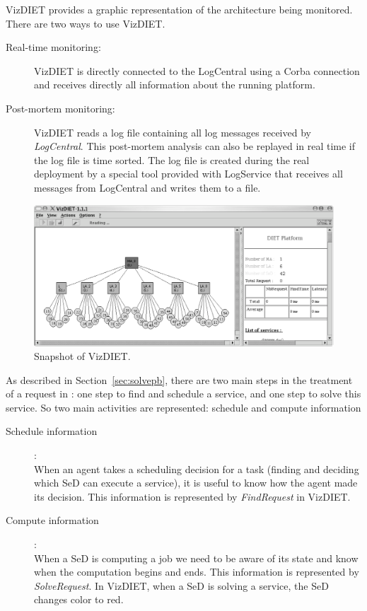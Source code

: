 VizDIET provides a graphic representation of the \diet architecture being
monitored. There are two ways to use VizDIET.
\begin{description}
        \item[Real-time monitoring:] VizDIET is directly connected to the
          LogCentral using a Corba connection and receives directly all
          information about the running \diet platform.

        \item[Post-mortem monitoring:] VizDIET reads a log file containing all
          log messages received by \textit{LogCentral}.  This post-mortem
          analysis can also be replayed in  real time if the log file is time
          sorted.  The log file is created during the real deployment by a
          special tool provided with LogService that receives all messages from
          LogCentral and writes them to a file.
\end{description}

\begin{figure}[htb]
  \begin{center}
    \includegraphics[scale=0.5]{fig/VizDIET}
    \caption{Snapshot of VizDIET.}
    \label{fig:snapshot}
  \end{center}
\end{figure}

As described in Section~\ref{sec:solvepb}, there are two main steps in the
treatment of a request in \diet: one step to find and schedule a service, and
one step to solve this service. So two main activities are represented:
schedule and compute information\\
\begin{description}
  \item [Schedule information]:\\ When an agent takes a scheduling decision for
    a task (\ie finding and deciding which SeD can execute a service), it is
    useful to know how the agent made its decision. This information is
    represented by \textit{FindRequest} in VizDIET.
  \item [Compute information]:\\ When a SeD is computing a job we need to be
    aware of its state and know when the computation begins and ends. This
    information is represented by \textit{SolveRequest}. In VizDIET, when a SeD
    is solving a service, the SeD changes color to red.\\
\end{description}

